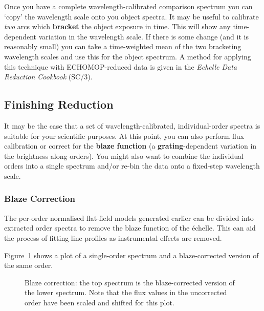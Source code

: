\documentclass[twoside,11pt]{article}
\newcommand{\htmlref}[2]{#1}
\newcommand{\xref}[3]{#1}
\newcommand{\xlabel}[1]{}
\newcommand{\sgspec}[2]{#1}
\newcommand{\sgspec}[2]{#2}
\begin{document}
Once you have a complete wavelength-calibrated comparison spectrum you
can `copy' the wavelength scale onto you object spectra.  It may be
useful to calibrate {\em two} arcs which \htmlref{{\bf bracket}}{gl_bracketing}
the object exposure in
time.  This will show any time-dependent variation in the wavelength
scale.  If there is some change (and it is reasonably small) you can
take a time-weighted mean of the two bracketing wavelength scales and use
this for the object spectrum.  A method for applying this technique
with \xref{ECHOMOP}{sun152}{}-reduced data is given in the
\xref{{\sl Echelle Data Reduction Cookbook} (SC/3)}{sc3}{MEANARC}\@.


\subsection{\label{se_finishing}\xlabel{finishing}Finishing Reduction}

It may be the case that a set of wavelength-calibrated, individual-order
spectra is suitable for your scientific purposes.  At this point, you
can also perform flux calibration or correct for the
\htmlref{{\bf blaze function}}{gl_blaze_correction} (a
\htmlref{{\bf grating}}{gl_grating}-dependent variation in the brightness along
orders).  You might also want to combine the individual orders into a single
spectrum and/or re-bin the data onto a fixed-step wavelength scale.

\subsubsection{Blaze Correction}

The per-order normalised flat-field models generated earlier can be
divided into extracted order spectra to remove the blaze function of the
\'{e}chelle.  This can aid the process of fitting line profiles as
instrumental effects are removed.

\sgspec{Figure~\ref{fi_blaze}}{The figure below} shows a plot of a
single-order spectrum and a blaze-corrected version of the same order.

\begin{figure}
\begin{center}
\sgspec{\leavevmode\epsfysize=105mm\epsfbox{sg9_05.eps}}
{\leavevmode\epsfysize=136mm}

\parbox{140mm}{
\caption{Blaze correction: the top spectrum is the blaze-corrected version of
the lower spectrum.  Note that the flux values in the uncorrected order have
been scaled and shifted for this plot.}
\label{fi_blaze}
}
\end{center}
\end{figure}
\end{document}
